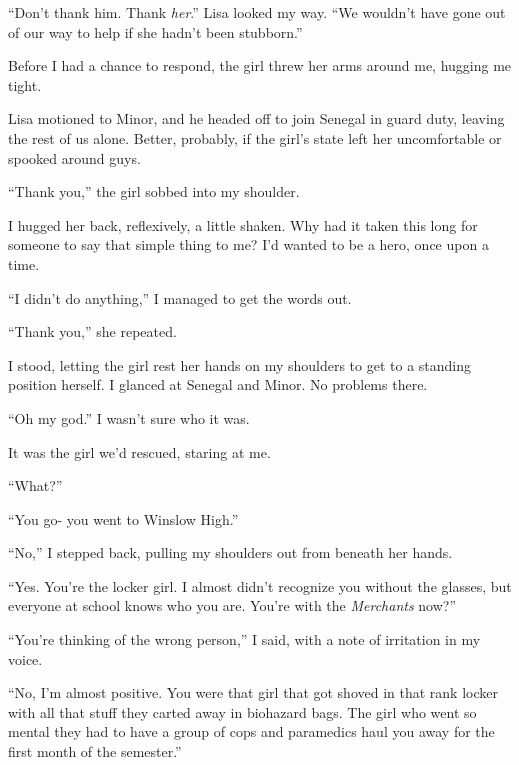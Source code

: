 ``Don't thank him.  Thank \emph{her}.''  Lisa looked my way.  ``We wouldn't have gone out of our way to help if she hadn't been stubborn.''



Before I had a chance to respond, the girl threw her arms around me, hugging me tight.



Lisa motioned to Minor, and he headed off to join Senegal in guard duty, leaving the rest of us alone.  Better, probably, if the girl's state left her uncomfortable or spooked around guys.



``Thank you,'' the girl sobbed into my shoulder.



I hugged her back, reflexively, a little shaken.  Why had it taken this long for someone to say that simple thing to me?  I'd wanted to be a hero, once upon a time.



``I didn't do anything,'' I managed to get the words out.



``Thank you,'' she repeated.



I stood, letting the girl rest her hands on my shoulders to get to a standing position herself.  I glanced at Senegal and Minor.  No problems there.



``Oh my god.''  I wasn't sure who it was.



It was the girl we'd rescued, staring at me.



``What?''



``You go- you went to Winslow High.''



``No,'' I stepped back, pulling my shoulders out from beneath her hands.



``Yes.  You're the locker girl.  I almost didn't recognize you without the glasses, but everyone at school knows who you are.  You're with the \emph{Merchants} now?''



``You're thinking of the wrong person,'' I said, with a note of irritation in my voice.



``No, I'm almost positive.  You were that girl that got shoved in that rank locker with all that stuff they carted away in biohazard bags.  The girl who went so mental they had to have a group of cops and paramedics haul you away for the first month of the semester.''




